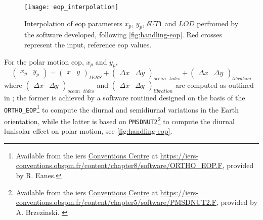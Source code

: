 \begin{figure}
    \centering
    \texttt{[image: eop\_interpolation]}
    \caption{Interpolation of \gls{eop} parameters $x_p$, $y_p$, $\delta UT1$ and $LOD$ 
        perfromed by the software developed, following \ref{fig:handling-eop}. Red crosses 
        represent the input, reference \gls{eop} values.}
    \label{fig:eop-interpolation-results}
  \end{figure}

For the polar motion \gls{eop}, $x_p$ and $y_p$,
\begin{equation}
    \begin{pmatrix} x_p & y_p \end{pmatrix} = 
    \begin{pmatrix} x & y \end{pmatrix}_{IERS} + 
    \begin{pmatrix} \Delta x & \Delta y \end{pmatrix}_{ocean\text{ }tides} + 
    \begin{pmatrix} \Delta x & \Delta y \end{pmatrix}_{libration} 
\end{equation}
where $\begin{pmatrix} \Delta x & \Delta y \end{pmatrix}_{ocean\text{ }tides}$ 
and $\begin{pmatrix} \Delta x & \Delta y \end{pmatrix}_{libration}$ are computed as 
outlined in \cite{iers2010}; the former is achieved by a software routined designed 
on the basis of the \texttt{ORTHO\_EOP}\footnote{Available from the \gls{iers} \href{https://iers-conventions.obspm.fr/}{Conventions Centre} at \url{https://iers-conventions.obspm.fr/content/chapter8/software/ORTHO_EOP.F}, provided by R. Eanes.\label{fn:ortho-eop-f}} 
to compute the diurnal and semidiurnal variations in the Earth orientation, while the latter 
is based on \texttt{PMSDNUT2}\footnote{Available from the \gls{iers} \href{https://iers-conventions.obspm.fr/}{Conventions Centre} at \url{https://iers-conventions.obspm.fr/content/chapter5/software/PMSDNUT2.F}, provided by A. Brzezinski. \label{fn:pmsdnut2-f}}
to compute the diurnal lunisolar effect on polar motion, see \autoref{fig:handling-eop}.

